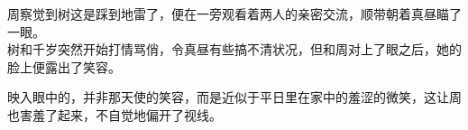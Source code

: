 周察觉到树这是踩到地雷了，便在一旁观看着两人的亲密交流，顺带朝着真昼瞄了一眼。\\

树和千岁突然开始打情骂俏，令真昼有些搞不清状况，但和周对上了眼之后，她的脸上便露出了笑容。

映入眼中的，并非那天使的笑容，而是近似于平日里在家中的羞涩的微笑，这让周也害羞了起来，不自觉地偏开了视线。
